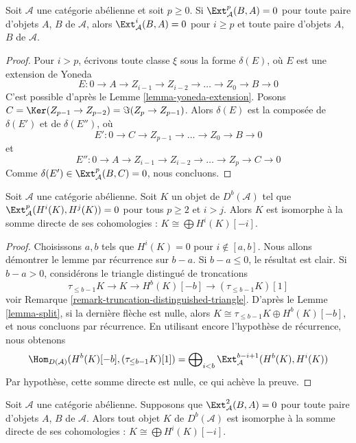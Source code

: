 \begin{lemma}
\label{lemma-higher-ext-zero}
Soit $\mathcal{A}$ une catégorie abélienne et soit $p \geq 0$.
Si $\Ext^p_\mathcal{A}(B, A) = 0$ pour toute paire d'objets $A$, $B$
de $\mathcal{A}$, alors $\Ext^i_\mathcal{A}(B, A) = 0$ pour
$i \geq p$ et toute paire d'objets $A$, $B$ de $\mathcal{A}$.
\end{lemma}

\begin{proof}
Pour $i > p$, écrivons toute classe $\xi$ sous la forme $\delta(E)$,
où $E$ est une extension de Yoneda
$$
E : 0 \to A \to Z_{i - 1} \to Z_{i - 2} \to \ldots \to Z_0 \to B \to 0
$$
C'est possible d'après le Lemme \ref{lemma-yoneda-extension}.
Posons $C = \Ker(Z_{p - 1} \to Z_{p - 2}) = \Im(Z_p \to Z_{p - 1})$.
Alors $\delta(E)$ est la composée de $\delta(E')$ et de $\delta(E'')$, où
$$
E' : 0 \to C \to Z_{p - 1} \to \ldots \to Z_0 \to B \to 0
$$
et
$$
E'' : 0 \to A \to Z_{i - 1} \to Z_{i - 2} \to \ldots \to Z_p \to C \to 0
$$
Comme $\delta(E') \in \Ext^p_\mathcal{A}(B, C) = 0$, nous concluons.
\end{proof}

\begin{lemma}
\label{lemma-ext-2-zero-pre}
Soit $\mathcal{A}$ une catégorie abélienne. Soit $K$ un objet de
$D^b(\mathcal{A})$ tel que $\Ext^p_\mathcal{A}(H^i(K), H^j(K)) = 0$
pour tous $p \geq 2$ et $i > j$. Alors $K$ est isomorphe à la somme directe
de ses cohomologies : $K \cong \bigoplus H^i(K)[-i]$.
\end{lemma}

\begin{proof}
Choisissons $a, b$ tels que $H^i(K) = 0$ pour $i \not \in [a, b]$.
Nous allons démontrer le lemme par récurrence sur $b - a$. Si $b - a \leq 0$,
le résultat est clair. Si $b - a > 0$, considérons le triangle distingué
de troncations
$$
\tau_{\leq b - 1}K \to K \to H^b(K)[-b] \to (\tau_{\leq b - 1}K)[1]
$$
voir Remarque \ref{remark-truncation-distinguished-triangle}.
D'après le Lemme \ref{lemma-split}, si la dernière flèche est nulle, alors
$K \cong \tau_{\leq b - 1}K \oplus H^b(K)[-b]$, et nous concluons par
récurrence. En utilisant encore l'hypothèse de récurrence, nous obtenons
$$
\Hom_{D(\mathcal{A})}(H^b(K)[-b], (\tau_{\leq b - 1}K)[1]) =
\bigoplus\nolimits_{i < b} \Ext_\mathcal{A}^{b - i + 1}(H^b(K), H^i(K))
$$
Par hypothèse, cette somme directe est nulle, ce qui achève la preuve.
\end{proof}

\begin{lemma}
\label{lemma-ext-2-zero}
Soit $\mathcal{A}$ une catégorie abélienne. Supposons que
$\Ext^2_\mathcal{A}(B, A) = 0$ pour toute paire d'objets $A$, $B$
de $\mathcal{A}$.
Alors tout objet $K$ de $D^b(\mathcal{A})$ est isomorphe à la somme directe
de ses cohomologies : $K \cong \bigoplus H^i(K)[-i]$.
\end{lemma}


